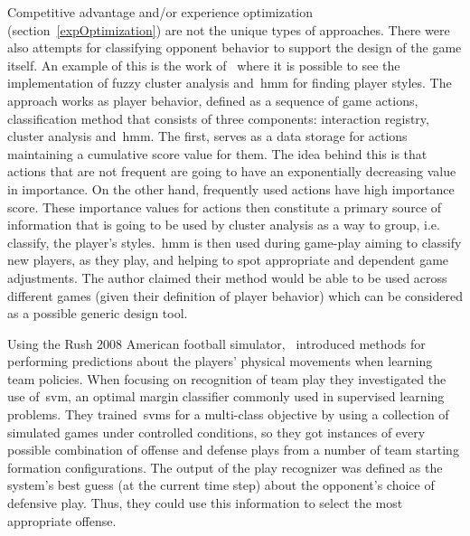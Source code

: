 Competitive advantage and/or experience optimization (section~\ref{expOptimization}) 
are not the unique types of approaches.%
There were also attempts for classifying opponent behavior to support the design of the game itself. An example of this is the work of~\cite{etheredge_generic_2013} where it is possible to see the implementation of fuzzy cluster analysis and~\gls{hmm} for finding player styles. The approach works as  player behavior, defined as a sequence of game actions, classification method that consists of three components: interaction registry, cluster analysis and~\gls{hmm}. The first, serves as a data storage for actions maintaining a cumulative score value for them. The idea behind this is that actions that are not frequent are going to have an exponentially decreasing value in importance. On the other hand, frequently used actions have high importance score. These importance values for actions then constitute a primary source of information that is going to be used by cluster analysis as a way to group, i.e. classify, the player's styles.~\gls{hmm} is then used during game-play aiming to classify new players, as they play, and helping to spot appropriate and dependent game adjustments. The author claimed their method would be able to be used across different games (given their definition of player behavior) which can be considered as a possible generic design tool.

Using the Rush 2008 American football simulator,~\cite{laviersa_using_2014} introduced methods for performing predictions about the players' physical movements when learning team policies. When focusing on recognition of team play they investigated the use of~\gls{svm}, an optimal margin classifier commonly used in supervised learning problems. They trained~\gls{svm}s for a multi-class objective by using a collection of simulated games under controlled conditions, so they got instances of every possible combination of offense and defense plays from a number of team starting formation configurations. The output of the play recognizer was defined as the system's best guess (at the current time step) about the opponent's choice of defensive play. Thus, they could use this information to select the most appropriate offense.

